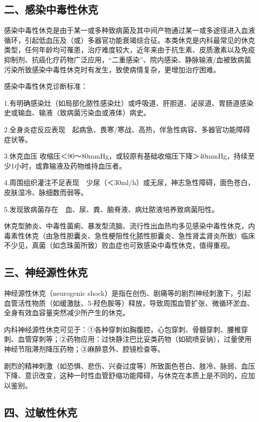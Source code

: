 \subsection{二、感染中毒性休克}

感染中毒性休克是由于某一或多种致病菌及其中间产物通过某一或多途径进入血液循环，引起低血压及（或）多器官功能衰竭综合征。本类休克是内科最常见的休克类型，任何年龄均可罹患，治疗难度较大，近年来由于抗生素、皮质激素以及免疫抑制剂、抗癌化疗药物广泛应用，“二重感染”、院内感染、静脉输液/血被致病菌污染所致感染中毒性休克时有发生，致使病情复杂，更增加治疗困难。

感染中毒性休克诊断标准：

1.有明确感染灶（如局部化脓性感染灶）或呼吸道、肝胆道、泌尿道、胃肠道感染史或输血、输液（致病菌污染血或液体）病史。

2.全身炎症反应表现　起病急、畏寒/寒战、高热，伴急性病容、多器官功能障碍症状等。

3.休克血压
收缩压＜90～80mmHg，或较原有基础收缩压下降＞40mmHg，持续至少1小时，或靠输液及药物维持血压者。

4.周围组织灌注不足表现　少尿（＜30ml/h）或无尿，神志急性障碍，面色苍白，皮肤湿冷、脉细数而弱等。

5.发现致病菌存在　血、尿、粪、脑脊液、病灶脓液培养致病菌阳性。

休克型肺炎、中毒性菌痢、暴发型流脑、流行性出血热均多见感染中毒性休克，内毒素性休克（由急性胆囊炎、急性梗阻性化脓性胆囊炎、急性肾盂肾炎所致）临床不少见，真菌（如念珠菌所致）败血症也可致感染中毒性休克，值得重视。

\subsection{三、神经源性休克}

神经源性休克（neurogenic
shock）是指在创伤、剧痛等的剧烈神经刺激下，引起血管活性物质（如缓激肽、5-羟色胺等）释放，导致周围血管扩张、微循环淤血、全身有效血容量突然减少所产生的休克。

内科神经源性休克可见于：①各种穿刺如胸腹腔，心包穿刺、骨髓穿刺、腰椎穿刺、血管穿刺等；②药物应用：过快静注巴比妥类药物（如硫喷妥钠），过量使用神经节阻滞剂降压药物；③麻醉意外、腔镜检查等。

剧烈的精神刺激（如恐惧、悲伤、兴奋过度等）所致面色苍白、肢冷、脉弱、血压下降、意识改变，这种一时性血管舒缩功能障碍，与休克在本质上是不同的，应加以鉴别。

\subsection{四、过敏性休克}

